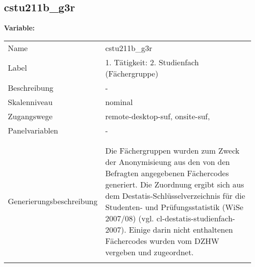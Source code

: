 	
	
	\subsection{cstu211b\_g3r}
	\label{subSection:cstu211b_g3r}

	\noindent\textbf{Variable:}\\
		\begin{tabular}{lL{11.3cm}}
			\label{tableVariable:cstu211b_g3r}
			Name & cstu211b\_g3r \\
			Label & 1. Tätigkeit: 2. Studienfach (Fächergruppe) \\
			Beschreibung & - \\
			Skalenniveau & nominal \\
			Zugangswege &
				remote-desktop-suf,
				onsite-suf,
 \\
			Panelvariablen & -
			 \\
			 \\
 \\
					Generierungsbeschreibung & Die Fächergruppen wurden zum Zweck der Anonymisieung aus den von den Befragten angegebenen Fächercodes generiert. Die Zuordnung ergibt sich aus dem Destatis-Schlüsselverzeichnis für die Studenten- und Prüfungsstatistik (WiSe 2007/08) (vgl. cl-destatis-studienfach-2007).  Einige darin nicht enthaltenen Fächercodes wurden vom DZHW vergeben und zugeordnet. 
				 \\	
			 \\
		\end{tabular}






